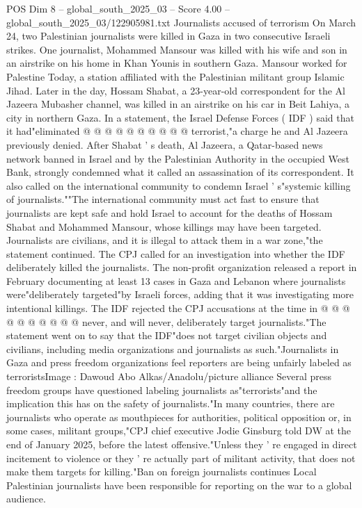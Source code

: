 \begin{textsample}{POS Dim 8 – global\_south\_2025\_03 – Score 4.00 – global\_south\_2025\_03/122905981.txt}
Journalists accused of terrorism On March 24, two Palestinian journalists were killed in Gaza in two consecutive Israeli strikes.
One journalist, Mohammed Mansour was killed with his wife and son in an airstrike on his home in Khan Younis in southern Gaza.
Mansour worked for Palestine Today, a station affiliated with the Palestinian militant group Islamic Jihad.
Later in the day, Hossam Shabat, a 23-year-old correspondent for the Al Jazeera Mubasher channel, was killed in an airstrike on his car in Beit Lahiya, a city in northern Gaza.
In a statement, the Israel Defense Forces ( IDF ) said that it had"eliminated @ @ @ @ @ @ @ @ @ @ terrorist,"a charge he and Al Jazeera previously denied.
After Shabat ' s death, Al Jazeera, a Qatar-based news network banned in Israel and by the Palestinian Authority in the occupied West Bank, strongly condemned what it called an assassination of its correspondent.
It also called on the international community to condemn Israel ' s"systemic killing of journalists.""The international community must act fast to ensure that journalists are kept safe and hold Israel to account for the deaths of Hossam Shabat and Mohammed Mansour, whose killings may have been targeted.
Journalists are civilians, and it is illegal to attack them in a war zone,"the statement continued.
The CPJ called for an investigation into whether the IDF deliberately killed the journalists.
The non-profit organization released a report in February documenting at least 13 cases in Gaza and Lebanon where journalists were"deliberately targeted"by Israeli forces, adding that it was investigating more intentional killings.
The IDF rejected the CPJ accusations at the time in @ @ @ @ @ @ @ @ @ @ never, and will never, deliberately target journalists."The statement went on to say that the IDF"does not target civilian objects and civilians, including media organizations and journalists as such."Journalists in Gaza and press freedom organizations feel reporters are being unfairly labeled as terroristsImage : Dawoud Abo Alkas/Anadolu/picture alliance Several press freedom groups have questioned labeling journalists as"terrorists"and the implication this has on the safety of journalists."In many countries, there are journalists who operate as mouthpieces for authorities, political opposition or, in some cases, militant groups,"CPJ chief executive Jodie Ginsburg told DW at the end of January 2025, before the latest offensive."Unless they ' re engaged in direct incitement to violence or they ' re actually part of militant activity, that does not make them targets for killing."Ban on foreign journalists continues Local Palestinian journalists have been responsible for reporting on the war to a global audience.

\end{textsample}
